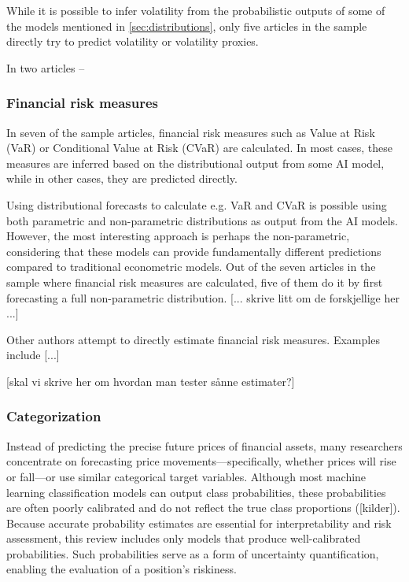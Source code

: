 While it is possible to infer volatility from the probabilistic outputs of some of the models mentioned in \ref{sec:distributions}, only five articles in the sample directly try to predict volatility or volatility proxies.

In two articles -- \textcite{}



\subsubsection{Financial risk measures}
In seven of the sample articles, financial risk measures such as Value at Risk (VaR) or Conditional Value at Risk (CVaR) are calculated. In most cases, these measures are inferred based on the distributional output from some AI model, while in other cases, they are predicted directly. 

Using distributional forecasts to calculate e.g. VaR and CVaR is possible using both parametric and non-parametric distributions as output from the AI models. However, the most interesting approach is perhaps the non-parametric, considering that these models can provide fundamentally different predictions compared to traditional econometric models. Out of the seven articles in the sample where financial risk measures are calculated, five of them do it by first forecasting a full non-parametric distribution. [... skrive litt om de forskjellige her ...]

Other authors attempt to directly estimate financial risk measures. Examples include [...]

[skal vi skrive her om hvordan man tester sånne estimater?]



\subsubsection{Categorization}
Instead of predicting the precise future prices of financial assets, many researchers concentrate on forecasting price movements—specifically, whether prices will rise or fall—or use similar categorical target variables. Although most machine learning classification models can output class probabilities, these probabilities are often poorly calibrated and do not reflect the true class proportions ([kilder]). Because accurate probability estimates are essential for interpretability and risk assessment, this review includes only models that produce well-calibrated probabilities. Such probabilities serve as a form of uncertainty quantification, enabling the evaluation of a position's riskiness.

